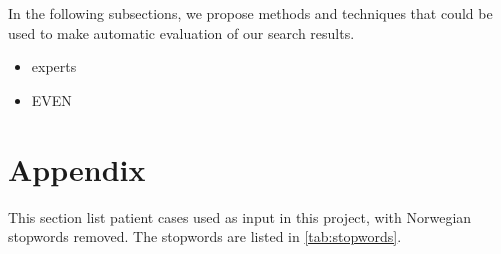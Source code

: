 \documentclass[a4paper, 11pt]{article}
\begin{document}
In the following subsections, we propose methods and techniques that could be used to make automatic evaluation of our search results.

\begin{itemize}
\item experts
\item EVEN
\end{itemize}


\appendix
\section{Appendix}
\label{appendix}
This section list patient cases used as input in this project, with Norwegian
stopwords removed. The stopwords are listed in \autoref{tab:stopwords}.


\end{document}
